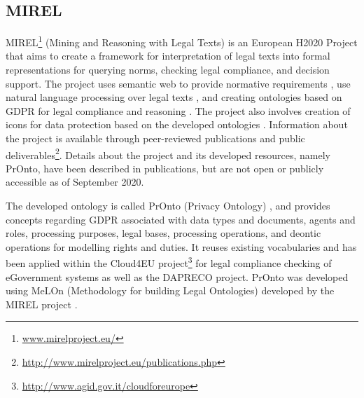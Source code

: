 \subsection*{MIREL}\label{sec:sota:MIREL}
MIREL\footnote{\url{www.mirelproject.eu/}} (Mining and Reasoning with Legal Texts) is an European H2020 Project that aims to create a framework for interpretation of legal texts into formal representations for querying norms, checking legal compliance, and decision support. The project uses semantic web to provide normative requirements \cite{gandon_normative_2017}, use natural language processing over legal texts \cite{teruel_legal_2018}, and creating ontologies based on GDPR \cite{monica_legal_2018} for legal compliance \cite{palmirani_pronto_compliance_2018} and reasoning \cite{palmirani_pronto_2018}. The project also involves creation of icons for data protection based on the developed ontologies \cite{arianna_dapis_2019}.
Information about the project is available through peer-reviewed publications and public deliverables\footnote{\url{http://www.mirelproject.eu/publications.php}}.
Details about the project and its developed resources, namely PrOnto,
have  been described in publications, but are not open or publicly
accessible as of September 2020.

The developed ontology is called PrOnto (Privacy Ontology) \cite{monica_legal_2018}, and provides concepts regarding GDPR associated with data types and documents, agents and roles, processing purposes, legal bases, processing operations, and deontic operations for modelling rights and duties. It reuses existing vocabularies \cite{palmirani_pronto_2018} and has been applied within the Cloud4EU project\footnote{\url{http://www.agid.gov.it/cloudforeurope}} for legal compliance checking of eGovernment systems as well as the DAPRECO project.
PrOnto was developed using MeLOn (Methodology for building Legal
Ontologies) developed by the MIREL project \cite{palmirani_pronto_2018,palmirani_pronto_compliance_2018,monica_modelling_2018}.

